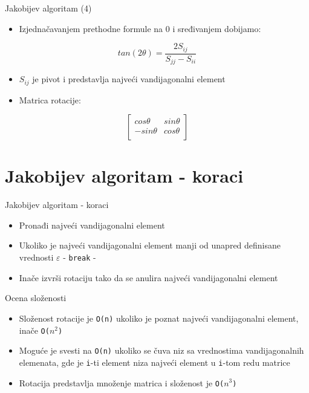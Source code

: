 \documentclass[serbian]{beamer}
\begin{document}
\begin{frame}{Jakobijev algoritam (4)}

	\begin{itemize}
		\item Izjednačavanjem prethodne formule na 0 i sređivanjem dobijamo:
	\end{itemize}
	
	\begin{equation}
		tan(2\theta) = \dfrac{2S_{ij}}{S_{jj} - S_{ii}}
	\end{equation}
	
	\begin{itemize}
		\item $S_{ij}$ je pivot i predstavlja najveći vandijagonalni element
		\item Matrica rotacije:
	\end{itemize}
	
	\[\begin{bmatrix}
    			cos\theta & sin\theta  \\
   			-sin\theta   &  cos\theta  \\
	\end{bmatrix}\]
	
\end{frame}

\section{Jakobijev algoritam - koraci}

\begin{frame}{Jakobijev algoritam - koraci}

\begin{itemize}
	\item Pronađi najveći vandijagonalni element
	\item Ukoliko je najveći vandijagonalni element manji od unapred definisane vrednosti $\varepsilon$ - \texttt{break} -
	\item Inače izvrši rotaciju tako da se anulira najveći vandijagonalni element
\end{itemize}

\end{frame}

\begin{frame}{Ocena slo\v zenosti}

\begin{itemize}
	\item Složenost rotacije je \texttt{O(n)} ukoliko je poznat najveći vandijagonalni element, inače \texttt{O($n^2$)}
	\item Moguće je svesti na \texttt{O(n)} ukoliko se čuva niz sa vrednostima vandijagonalnih elemenata, gde je \texttt{i}-ti element niza najveći element u \texttt{i}-tom redu matrice
	\item Rotacija predstavlja množenje matrica i složenost je \texttt{O($n^3$)}
\end{itemize}

\end{frame}
\end{document}
